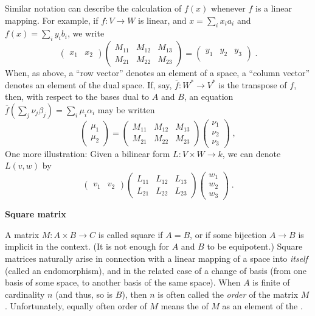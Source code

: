 \documentclass[12pt]{article}
\begin{document}
Similar notation can describe the calculation of $f(x)$ whenever $f$
is a linear mapping. For example, if $f\colon V\to W$ is linear,
and $x=\sum_ix_ia_i$ and $f(x)=\sum_iy_ib_i$, we write
$$
\begin{pmatrix}
x_1 & x_2
\end{pmatrix}
\begin{pmatrix}
M_{11} & M_{12} & M_{13} \\
M_{21} & M_{22} & M_{23}
\end{pmatrix}
=
\begin{pmatrix}
y_1 & y_2 & y_3 \\
\end{pmatrix}\;.
$$
When, as above, a ``row vector'' denotes an element of a space,
a ``column vector'' denotes an element of the dual space.
If, say, $\overline{f}\colon W^*\to V^*$ is the transpose of $f$,
then, with respect to the bases dual to $A$ and $B$,
an equation $\overline{f}(\sum_j\nu_j\beta_j)=\sum_i\mu_i\alpha_i$
may be written
$$
\begin{pmatrix} \mu_1 \\ \mu_2 \end{pmatrix}
=
\begin{pmatrix}
M_{11} & M_{12} & M_{13} \\
M_{21} & M_{22} & M_{23}
\end{pmatrix}
\begin{pmatrix} \nu_1 \\ \nu_2 \\ \nu_3 \end{pmatrix}\;,
$$
One more illustration: Given a bilinear form $L\colon V\times W\to k$,
we can denote $L(v,w)$ by
$$
\begin{pmatrix} v_1 & v_2 \end{pmatrix}
\begin{pmatrix}
L_{11} & L_{12} & L_{13} \\
L_{21} & L_{22} & L_{23}
\end{pmatrix}
\begin{pmatrix} w_1 \\ w_2 \\ w_3 \end{pmatrix}\;.
$$

\textbf{Square matrix}

A matrix $M\colon A\times B\to C$ is called square if $A=B$, or if some
bijection $A\to B$ is implicit in the context.
(It is not enough for $A$ and $B$ to be equipotent.)
Square matrices naturally arise in connection with a linear mapping of
a space into \emph{itself} (called an endomorphism), and in the related
case of a change of basis (from one basis of some space, to another
basis of the same space).  When $A$ is finite of cardinality $n$ (and thus, so is $B$), then $n$ is often called the \emph{order} of the matrix $M$. Unfortunately, equally often order of $M$ means the  of $M$ as an element of the .
\end{document}
